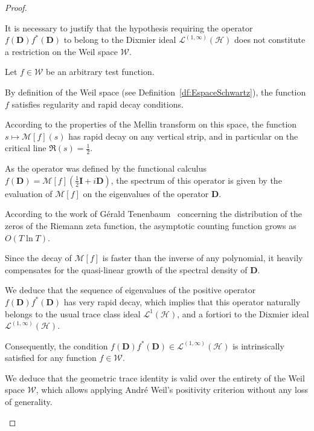 \documentclass[Riemann_Hypothesis.tex]{subfiles}
\begin{document}
\begin{proof}
    \begin{part_proof}
        It is necessary to justify that the hypothesis requiring the operator $f(\mathbf{D}) f^*(\mathbf{D})$ to belong to the Dixmier ideal $\mathcal{L}^{(1, \infty)}(\mathcal{H})$ does not constitute a restriction on the Weil space $\mathcal{W}$. \par
        Let $f \in \mathcal{W}$ be an arbitrary test function. \par
        By definition of the Weil space (see Definition~\ref{df:EspaceSchwartz}), the function $f$ 
        satisfies regularity and rapid decay conditions. \par
        According to the properties of the Mellin transform on this space, the function 
        $s \mapsto \mathcal{M}[f](s)$ has rapid decay on any vertical strip, and in particular on the 
        critical line $\Re(s) = \frac{1}{2}$. \par
        As the operator was defined by the functional calculus 
        $f(\mathbf{D}) = \mathcal{M}[f]\left(\frac{1}{2}\mathbf{I} + i\mathbf{D}\right)$, 
        the spectrum of this operator is given by the evaluation of $\mathcal{M}[f]$ on the 
        eigenvalues of the operator $\mathbf{D}$. \par
        According to the work of Gérald Tenenbaum~\cite{tenenbaum2015_intro_en} concerning the distribution 
        of the zeros of the Riemann zeta function, the asymptotic counting function grows as $O(T \ln T)$. \par
        Since the decay of $\mathcal{M}[f]$ is faster than the inverse of any polynomial, it heavily 
        compensates for the quasi-linear growth of the spectral density of $\mathbf{D}$. \par
        We deduce that the sequence of eigenvalues of the positive 
        operator $f(\mathbf{D}) f^*(\mathbf{D})$ has very rapid decay, which implies that this 
        operator naturally belongs to the usual trace class ideal $\mathcal{L}^1(\mathcal{H})$, and a 
        fortiori to the Dixmier ideal $\mathcal{L}^{(1, \infty)}(\mathcal{H})$. \par
        Consequently, the condition $f(\mathbf{D}) f^*(\mathbf{D}) \in \mathcal{L}^{(1, \infty)}
        (\mathcal{H})$ is intrinsically satisfied for any function $f \in \mathcal{W}$. \par
        We deduce that the geometric trace identity is valid over the entirety of the Weil space 
        $\mathcal{W}$, which allows applying André Weil's positivity criterion without any loss of 
        generality.
    \end{part_proof}



\end{proof}
\end{document}
